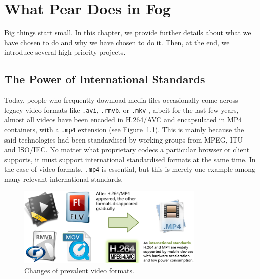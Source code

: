 \chapter{What Pear Does in Fog}\label{sec-decisions}
Big things start small. In this chapter, we provide further details about what we have chosen to do and why we have chosen to do it. Then, at the end, we introduce several high priority projects. 

\section{The Power of International Standards}
Today, people who frequently download media files occasionally come across legacy video formats like \texttt{.avi}, \texttt{.rmvb}, or \texttt{.mkv} , albeit for the last few years, almost all videos have been encoded in H.264/AVC and encapsulated in MP4 containers, with a \texttt{.mp4} extension (see Figure~\ref{fig:video-formats}). This is mainly because the said technologies had been standardised by working groups from MPEG, ITU and ISO/IEC. No matter what proprietary codecs a particular browser or client supports, it must support international standardised formats at the same time. In the case of video formats, \texttt{.mp4} is essential, but this is merely one example among many relevant international standards.  
\begin{figure}[hbt]
	\centering
	\includegraphics[width=0.80\textwidth]{fig/decisions/video-formats.png} 
	\caption{Changes of prevalent video formats.}\label{fig:video-formats}
\end{figure}

